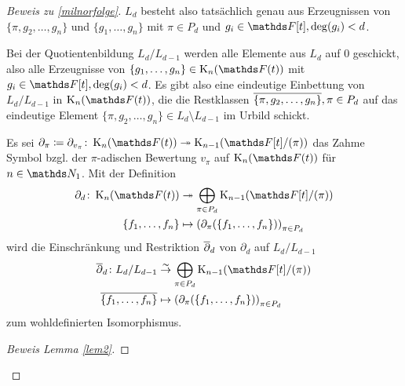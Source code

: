 \documentclass[ngerman,fontsize=11pt, paper=a4, parskip=half, titlepage=true, toc=bib]{scrartcl}
\begin{document}
\begin{proof}[Beweis zu \ref{milnorfolge}]
  $L_d$ besteht also tatsächlich genau aus Erzeugnissen von
  $\{\pi,g_2,\dotsc,g_n\}$ und $\{g_1,\dotsc,g_n\}$
  mit $\pi\in P_d$ und $g_i\in\F[t], \deg(g_i)<d$.

  Bei der Quotientenbildung $L_d/L_{d-1}$ werden alle Elemente aus
  $L_d$ auf $0$ geschickt, also alle Erzeugnisse von
  $\{g_1,\dotsc,g_n\}\in\KnFt$ mit $g_i\in\F[t], \deg(g_i)<d$.
  Es gibt also eine eindeutige Einbettung von $L_d/L_{d-1}$ in
  $\KnFt$, die die Restklassen $\overline{\{\pi,g_2,\dotsc,g_n\}}, \pi\in
  P_d$ auf das eindeutige Element 
  $\{\pi,g_2,\dotsc,g_n\}\in L_d\setminus L_{d-1}$
  im Urbild schickt.

  \begin{Lem}[\ref{2}]\label{lem2}
    Es sei $\partial_\pi\coloneqq \partial_{v_\pi}\colon
    \KnFt\twoheadrightarrow\K_{n-1}(\Ftpi)$
    das Zahme Symbol bzgl. der $\pi$-adischen Bewertung $v_\pi$ auf
    $\KnFt$ für $n\in\N_1$.
    Mit der Definition
    \begin{align*}
      \partial_d\colon \KnFt
      &\twoheadrightarrow \bigoplus_{\pi\in
        P_d}\K_{n-1}(\Ftpi)\\
      \{f_1,\dotsc,f_n\}
      &\mapsto\left(
        \partial_\pi(\{f_1,\dotsc,f_n\})
        \right)_{\pi\in P_d}
    \end{align*}
    wird die Einschränkung und Restriktion $\overline{\partial}_d$ 
    von $\partial_d$ auf $L_d/L_{d-1}$
    \begin{align*}
      \ov{\partial}_d\colon L_d/L_{d-1}
      &\overset{\thicksim}{\rightarrow} \bigoplus_{\pi\in
        P_d}\K_{n-1}(\Ftpi)\\
      \ov{\{f_1,\dotsc,f_n\}}
      &\mapsto\left(
        \partial_\pi(\{f_1,\dotsc,f_n\})
        \right)_{\pi\in P_d}
    \end{align*}
    zum wohldefinierten Isomorphismus.
  \end{Lem}
  \begin{proof}[Beweis Lemma \ref{lem2}]

\end{proof}
\end{proof}
\end{document}
